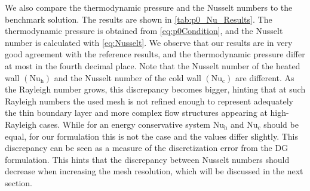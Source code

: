 {We also compare the thermodynamic pressure and the Nusselt numbers to the benchmark solution. The results are shown in \cref{tab:p0_Nu_Results}. The thermodynamic pressure is obtained from \cref{eq:p0Condition}, and the Nusselt number is calculated with \cref{eq:Nusselt}. We observe that our results are in very good agreement with the reference results, and the thermodynamic pressure differ at most in the fourth decimal place. Note that the Nusselt number of the heated  wall $(\text{Nu}_\text{h})$ and the Nusselt number of the cold wall $(\text{Nu}_\text{c})$ are different.  As the Rayleigh number grows, this discrepancy becomes bigger, hinting that at such Rayleigh numbers the used mesh is not refined enough  to represent adequately the thin boundary layer and more complex flow structures appearing at high-Rayleigh cases. While for an energy conservative system $\text{Nu}_\text{h}$ and $\text{Nu}_c$ should be equal, for our formulation this is not the case and the values differ slightly. This discrepancy can be seen as a measure of the discretization error from the DG formulation.\cite{kleinHighorderDiscontinuousGalerkin2016} This hints that the discrepancy between Nusselt numbers should decrease when increasing the mesh resolution, which will be discussed in the next section. 


}
